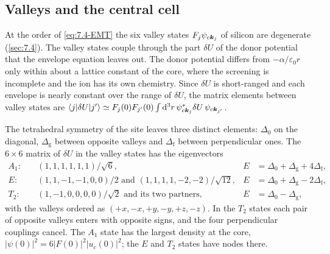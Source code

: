 \subsection*{Valleys and the central cell}

At the order of \cref{eq:7.4-EMT} the six valley states $F_j\psi_{c\bm{k}_j}$ of silicon are degenerate (\cref{sec:7.4}). The valley states couple through the part $\delta U$ of the donor potential that the envelope equation leaves out. The donor potential differs from $-\alpha/\varepsilon_0r$ only within about a lattice constant of the core, where the screening is incomplete and the ion has its own chemistry. Since $\delta U$ is short-ranged and each envelope is nearly constant over the range of $\delta U$, the matrix elements between valley states are $\langle j|\delta U|j'\rangle \simeq F_j(0)F_{j'}(0)\int\mathrm{d}^3r\,\psi^*_{c\bm{k}_j}\delta U\,\psi_{c\bm{k}_{j'}}$.

The tetrahedral symmetry of the site leaves three distinct elements: $\Delta_0$ on the diagonal, $\Delta_{\mathrm{g}}$ between opposite valleys and $\Delta_{\mathrm{f}}$ between perpendicular ones. The $6\times6$ matrix of $\delta U$ in the valley states has the eigenvectors
\begin{equation}
  \begin{aligned}
  A_1:&\quad (1,1,1,1,1,1)/\sqrt6, & E &= \Delta_0 + \Delta_{\mathrm{g}} + 4\Delta_{\mathrm{f}} ,\\
  E:&\quad (1,1,-1,-1,0,0)/2 \text{ and } (1,1,1,1,-2,-2)/\sqrt{12}, & E &= \Delta_0 + \Delta_{\mathrm{g}} - 2\Delta_{\mathrm{f}} ,\\
  T_2:&\quad (1,-1,0,0,0,0)/\sqrt2 \text{ and its two partners}, & E &= \Delta_0 - \Delta_{\mathrm{g}} ,
  \end{aligned}
  \label{eq:D.23-vo}
\end{equation}
with the valleys ordered as $(+x,-x,+y,-y,+z,-z)$. In the $T_2$ states each pair of opposite valleys enters with opposite signs, and the four perpendicular couplings cancel. The $A_1$ state has the largest density at the core, $|\psi(0)|^2 = 6|F(0)|^2|u_c(0)|^2$; the $E$ and $T_2$ states have nodes there.
